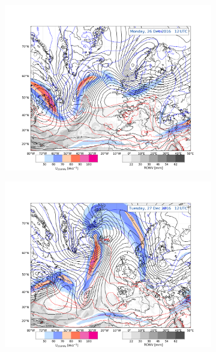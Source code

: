 \begin{figure}
\begin{subfigure}[b]{0.49\textwidth}
    \end{subfigure}
    \begin{subfigure}[b]{0.49\textwidth}
        \includegraphics[trim={4.2cm 3.9cm 4.3cm 5.1cm},clip,
        width=\textwidth]{./fig_Geopot_Jet/20161226_12}
        \caption{}\label{fig:GP26}
    \end{subfigure}
    \begin{subfigure}[b]{0.49\textwidth}
        \includegraphics[trim={4.2cm 3.9cm 4.3cm 5.1cm},clip,
        width=\textwidth]{./fig_Geopot_Jet/20161227_12}
        \caption{}\label{fig:GP27}

\end{subfigure}
\end{figure}
